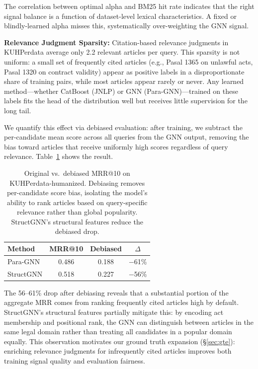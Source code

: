 The correlation between optimal alpha and BM25 hit rate indicates that the right signal balance is a function of dataset-level lexical characteristics. A fixed or blindly-learned alpha misses this, systematically over-weighting the GNN signal.

\noindent\textbf{Relevance Judgment Sparsity:} Citation-based relevance judgments in KUHPerdata average only 2.2 relevant articles per query. This sparsity is not uniform: a small set of frequently cited articles (e.g., Pasal 1365 on unlawful acts, Pasal 1320 on contract validity) appear as positive labels in a disproportionate share of training pairs, while most articles appear rarely or never. Any learned method---whether CatBoost (JNLP) or GNN (Para-GNN)---trained on these labels fits the head of the distribution well but receives little supervision for the long tail.

We quantify this effect via debiased evaluation: after training, we subtract the per-candidate mean score across all queries from the GNN output, removing the bias toward articles that receive uniformly high scores regardless of query relevance. Table~\ref{tab:debiased} shows the result.

\begin{table}[t]
\centering
\small
\begin{tabular}{lccc}
\hline
\textbf{Method} & \textbf{MRR@10} & \textbf{Debiased} & \textbf{$\Delta$} \\
\hline
Para-GNN & 0.486 & 0.188 & $-$61\% \\
StructGNN & 0.518 & 0.227 & $-$56\% \\
\hline
\end{tabular}
\caption{\label{tab:debiased}
Original vs.\ debiased MRR@10 on KUHPerdata-humanized. Debiasing removes per-candidate score bias, isolating the model's ability to rank articles based on query-specific relevance rather than global popularity. StructGNN's structural features reduce the debiased drop.
}
\end{table}

The 56--61\% drop after debiasing reveals that a substantial portion of the aggregate MRR comes from ranking frequently cited articles high by default. StructGNN's structural features partially mitigate this: by encoding act membership and positional rank, the GNN can distinguish between articles in the same legal domain rather than treating all candidates in a popular domain equally. This observation motivates our ground truth expansion (\S\ref{sec:gte}): enriching relevance judgments for infrequently cited articles improves both training signal quality and evaluation fairness.
